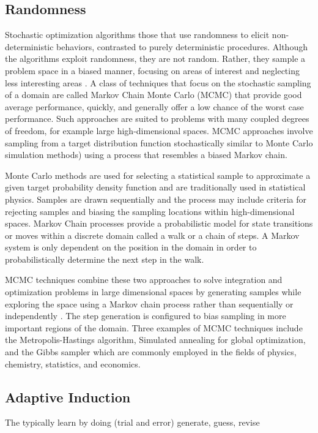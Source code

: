 \documentclass[a4paper, 11pt]{article}
\begin{document}
% 
% 
\subsection{Randomness}
Stochastic optimization algorithms those that use randomness to elicit non-deterministic behaviors, contrasted to purely deterministic procedures. Although the algorithms exploit randomness, they are not random. Rather, they sample a problem space in a biased manner, focusing on areas of interest and neglecting less interesting areas \cite{Spall2003}. 
A class of techniques that focus on the stochastic sampling of a domain are called Markov Chain Monte Carlo (MCMC) that provide good average performance, quickly, and generally offer a low chance of the worst case performance. Such approaches are suited to problems with many coupled degrees of freedom, for example large high-dimensional spaces. MCMC approaches involve sampling from a target distribution function stochastically similar to Monte Carlo simulation methods) using a process that resembles a biased Markov chain.

Monte Carlo methods are used for selecting a statistical sample to approximate a given target probability density function and are traditionally used in statistical physics. Samples are drawn sequentially and the process may include criteria for rejecting samples and biasing the sampling locations within high-dimensional spaces. 
Markov Chain processes provide a probabilistic model for state transitions or moves within a discrete domain called a walk or a chain of steps. A Markov system is only dependent on the position in the domain in order to probabilistically determine the next step in the walk. 

MCMC techniques combine these two approaches to solve integration and optimization problems in large dimensional spaces by generating samples while exploring the space using a Markov chain process rather than sequentially or independently \cite{Andrieu2003}. The step generation is configured to bias sampling in more important regions of the domain. Three examples of MCMC techniques include the Metropolis-Hastings algorithm, Simulated annealing for global optimization, and the Gibbs sampler which are commonly employed in the fields of physics, chemistry, statistics, and economics. 


% 
% 
\subsection{Adaptive Induction}
The typically learn by doing (trial and error)
generate, guess, revise
\end{document}
